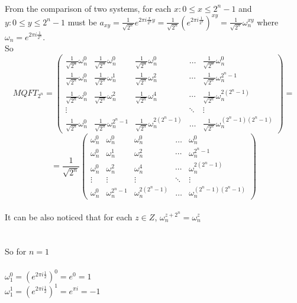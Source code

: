 \documentclass{article}
\begin{document}
\\
From the comparison of two systems, for each $x : 0 \leq x \leq 2^n-1 $ and $y : 0 \leq y \leq 2^n-1 $ must be $a_{xy} = \frac{1}{\sqrt{2^n}}e^{2\pi i \frac{x}{2^n}y} = \frac{1}{\sqrt{2^n}}(e^{2\pi i \frac{1}{2^n}})^{xy} = \frac{1}{\sqrt{2^n}}\omega_n^{xy} $ where $\omega_n = e^{2\pi i \frac{1}{2^n}}$. 
\\
So \\
\[ MQFT_{2^n} = \begin{pmatrix} 
\frac{1}{\sqrt{2^n}}\omega_n^{0} & \frac{1}{\sqrt{2^n}}\omega_n^{0}  & \frac{1}{\sqrt{2^n}}\omega_n^{0} &\ldots  & \frac{1}{\sqrt{2^n}}\omega_n^{0}  \\ 
\frac{1}{\sqrt{2^n}}\omega_n^{0} & \frac{1}{\sqrt{2^n}}\omega_n^{1} & \frac{1}{\sqrt{2^n}}\omega_n^{2} & \cdots & \frac{1}{\sqrt{2^n}}\omega_n^{2^n-1} \\ 
\frac{1}{\sqrt{2^n}}\omega_n^{0} & \frac{1}{\sqrt{2^n}}\omega_n^{2} & \frac{1}{\sqrt{2^n}}\omega_n^{4} & \cdots & \frac{1}{\sqrt{2^n}}\omega_n^{2(2^n-1)} \\ 
\vdots & & & \ddots & \vdots \\
\frac{1}{\sqrt{2^n}}\omega_n^{0} & \frac{1}{\sqrt{2^n}}\omega_n^{2^n-1} &  \frac{1}{\sqrt{2^n}}\omega_n^{2(2^n-1)} & \ldots & \frac{1}{\sqrt{2^n}}\omega_n^{(2^n-1)(2^n-1)}
\end{pmatrix} = \]
\[= \frac{1}{\sqrt{2^n}} \begin{pmatrix} 
\omega_n^{0} & \omega_n^{0}  & \omega_n^{0} &\ldots  & \omega_n^{0}  \\ 
\omega_n^{0} & \omega_n^{1} & \omega_n^{2} & \cdots & \omega_n^{2^n-1} \\ 
\omega_n^{0} & \omega_n^{2} & \omega_n^{4} & \cdots & \omega_n^{2(2^n-1)} \\ 
\vdots & \vdots  & \vdots & \ddots & \vdots   \\
\omega_n^{0} & \omega_n^{2^n-1} & \omega_n^{2(2^n-1)} & \ldots & \omega_n^{(2^n-1)(2^n-1)}
\end{pmatrix}
\] 
\\
It can be also noticed that for each $z \in Z$, $\omega_n^{z + {2^n}} = \omega_n^z$
\\ \\ \\
So for $n=1$\\ \\
\(\omega_1^0 = (e^{2\pi i \frac{1}{2}})^{0} = e^{0} = 1 \)\\
\(\omega_1^1 = (e^{2\pi i \frac{1}{2}})^{1} = e^{\pi i } = -1 \)\\
\end{document}
